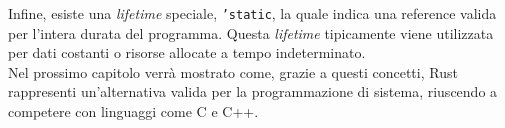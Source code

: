 Infine, esiste una \textit{lifetime} speciale, \texttt{'static}, la quale indica una reference valida per l'intera durata del programma. Questa \textit{lifetime} tipicamente viene utilizzata per dati costanti o risorse allocate a tempo indeterminato.\hfill
\vspace{15pt}\\
\noindent Nel prossimo capitolo verrà mostrato come, grazie a questi concetti, Rust rappresenti un'alternativa valida
per la programmazione di sistema, riuscendo a competere con linguaggi come C e C++.